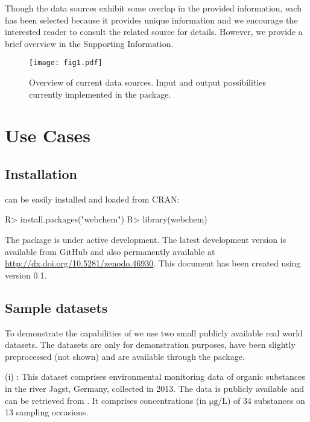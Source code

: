 \documentclass[article, shortnames]{jss}\usepackage[]{graphicx}\usepackage[]{color}
\begin{document}
Though the data sources exhibit some overlap in the provided information, each has been selected because it provides unique information and we encourage the interested reader to consult the related source for details. 
However, we provide a brief overview in the Supporting Information.

\begin{figure}[ht]
  \centering
  \texttt{[image: fig1.pdf]}
  \caption{Overview of current data sources. Input and output possibilities currently implemented in the package.}
  \label{fig:fig1}
\end{figure}


\section[Use Cases]{Use Cases}
\subsection[Install webchem]{Installation}
 can be easily installed and loaded from CRAN:

\begin{CodeChunk}
\begin{CodeInput}
R> install.packages("webchem")
R> library(webchem)
\end{CodeInput}
\end{CodeChunk}




The package is under active development. The latest development version is available from GitHub and also permanently available at \url{http://dx.doi.org/10.5281/zenodo.46930}.
This document has been created using  version 0.1.


\subsection[Sample datasets]{Sample datasets}
To demonstrate the capabilities of   we use two small publicly available real world datasets.
The datasets are only for demonstration purposes, have been slightly preprocessed (not shown) and are available through the package.

(i) : This dataset comprises environmental monitoring data of organic substances in the river Jagst, Germany, collected in 2013.
The data is publicly available and can be retrieved from .
It comprises concentrations  (in $\mathrm{\mu g/L}$) of  34 substances  on 13 sampling occasions.
\end{document}
